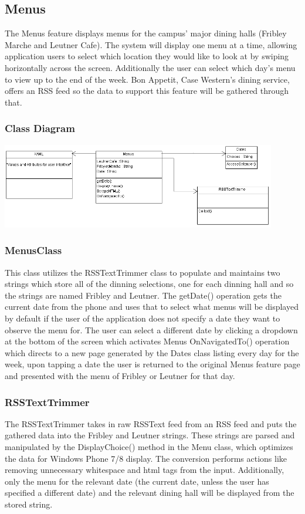 \documentclass[pdftex,12pt,letter]{article}
\begin{document}
\subsection{Menus}
The Menus feature displays menus for the campus' major dining halls (Fribley Marche and Leutner Cafe). The system will display one menu at a time, allowing application users to select which location they would like to look at by swiping horizontally across the screen. Additionally the user can select which day's menu to view up to the end of the week. Bon Appetit, Case Western's dining service, offers an RSS feed so the data to support this feature will be gathered through that.
\subsubsection{Class Diagram}
\begin{flushleft}
\includegraphics[width=120mm]{MenuCD.png}
\end{flushleft}
\subsubsection{MenusClass}
This class utilizes the RSSTextTrimmer class to populate and maintains two strings which store all of the dinning selections, one for each dinning hall and so the strings are named Fribley and Leutner. The getDate() operation gets the current date from the phone and uses that to select what menus will be displayed by default if the user of the application does not specify a date they want to observe the menu for. The user can select a different date by clicking a dropdown at the bottom of the screen which activates Menus OnNavigatedTo() operation which directs to a new page generated by the Dates class listing every day for the week, upon tapping a date the user is returned to the original Menus feature page and presented with the menu of Fribley or Leutner for that day.
\subsubsection{RSSTextTrimmer}
The RSSTextTrimmer takes in raw RSSText feed from an RSS feed and
puts the gathered data into the Fribley and Leutner strings. These strings are parsed and manipulated by the DisplayChoice() method in the Menu class, which optimizes the data for Windows Phone 7/8 display. The conversion performs actions like removing unnecessary whitespace and html tags from the input. Additionally, only the menu for the relevant date (the current date, unless the user has specified a different date) and the relevant dining hall will be displayed from the stored string.
\end{document}
